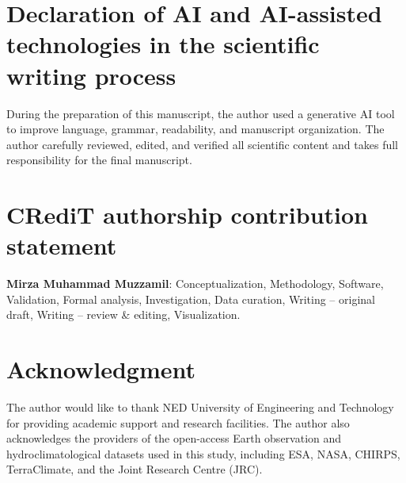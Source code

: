 \documentclass[preprint,12pt]{elsarticle}
\begin{document}
\section*{Declaration of AI and AI-assisted technologies in the scientific writing process}
During the preparation of this manuscript, the author used a generative AI tool to improve language, grammar, readability, and manuscript organization. The author carefully reviewed, edited, and verified all scientific content and takes full responsibility for the final manuscript.

\section*{CRediT authorship contribution statement}
\textbf{Mirza Muhammad Muzzamil}: Conceptualization, Methodology, Software, Validation, Formal analysis, Investigation, Data curation, Writing -- original draft, Writing -- review \& editing, Visualization.

\section*{Acknowledgment}

The author would like to thank NED University of Engineering and Technology for providing academic support and research facilities. The author also acknowledges the providers of the open-access Earth observation and hydroclimatological datasets used in this study, including ESA, NASA, CHIRPS, TerraClimate, and the Joint Research Centre (JRC).



\end{document}
